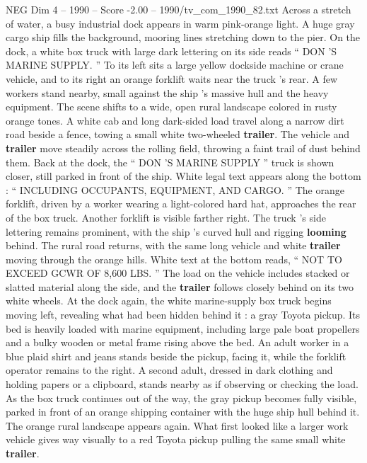 \begin{textsample}{NEG Dim 4 – 1990 – Score -2.00 – 1990/tv\_com\_1990\_82.txt}  \label{ex:f4_neg_023}
Across a stretch of water, a busy industrial dock appears in warm pink-orange light.
A huge gray cargo ship fills the background, mooring lines stretching down to the pier.
On the dock, a white box truck with large dark lettering on its side reads “ DON ’S MARINE SUPPLY. ” To its left sits a large yellow dockside machine or crane vehicle, and to its right an orange forklift waits near the truck ’s rear.
A few workers stand nearby, small against the ship ’s massive hull and the heavy equipment.
The scene shifts to a wide, open rural landscape colored in rusty orange tones.
A white cab and long dark-sided load travel along a narrow dirt road beside a fence, towing a small white two-wheeled \textbf{trailer}.
The vehicle and \textbf{trailer} move steadily across the rolling field, throwing a faint trail of dust behind them.
Back at the dock, the “ DON ’S MARINE SUPPLY ” truck is shown closer, still parked in front of the ship.
White legal text appears along the bottom : “ INCLUDING OCCUPANTS, EQUIPMENT, AND CARGO. ” The orange forklift, driven by a worker wearing a light-colored hard hat, approaches the rear of the box truck.
Another forklift is visible farther right.
The truck ’s side lettering remains prominent, with the ship ’s curved hull and rigging \textbf{looming} behind.
The rural road returns, with the same long vehicle and white \textbf{trailer} moving through the orange hills.
White text at the bottom reads, “ NOT TO EXCEED GCWR OF 8,600 LBS. ” The load on the vehicle includes stacked or slatted material along the side, and the \textbf{trailer} follows closely behind on its two white wheels.
At the dock again, the white marine-supply box truck begins moving left, revealing what had been hidden behind it : a gray Toyota pickup.
Its bed is heavily loaded with marine equipment, including large pale boat propellers and a bulky wooden or metal frame rising above the bed.
An adult worker in a blue plaid shirt and jeans stands beside the pickup, facing it, while the forklift operator remains to the right.
A second adult, dressed in dark clothing and holding papers or a clipboard, stands nearby as if observing or checking the load.
As the box truck continues out of the way, the gray pickup becomes fully visible, parked in front of an orange shipping container with the huge ship hull behind it.
The orange rural landscape appears again.
What first looked like a larger work vehicle gives way visually to a red Toyota pickup pulling the same small white \textbf{trailer}.

\end{textsample}
